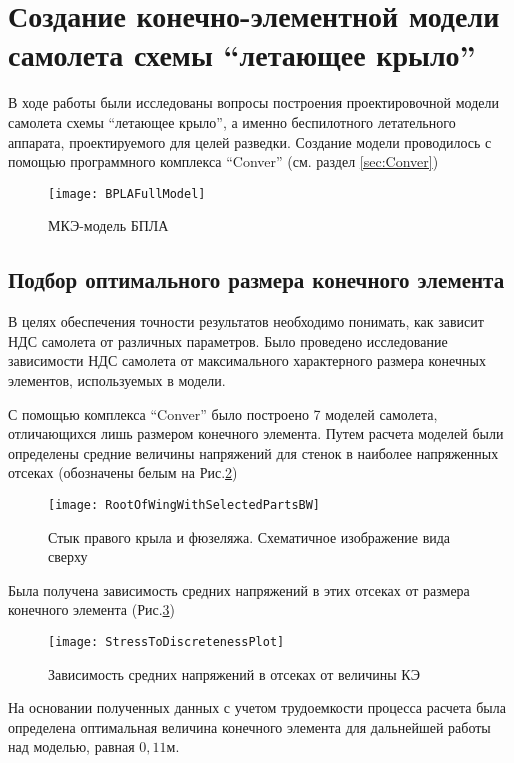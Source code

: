 \section{Создание конечно-элементной модели самолета схемы ``летающее крыло''}

В ходе работы были исследованы вопросы построения проектировочной модели самолета схемы ``летающее крыло'', а именно беспилотного летательного аппарата, проектируемого для целей разведки. Создание модели проводилось с помощью программного комплекса ``Conver'' (см. раздел \ref{sec:Conver})

\begin{figure}[ht]
\centering
\texttt{[image: BPLAFullModel]}
\caption{МКЭ-модель БПЛА}
\label{fig:BPLAFullModel}
\end{figure}

\subsection{Подбор оптимального размера конечного элемента}

В целях обеспечения точности результатов необходимо понимать, как зависит НДС самолета от различных параметров. Было проведено исследование зависимости НДС самолета от максимального характерного размера конечных элементов, используемых в модели. 

С помощью комплекса ``Conver'' было построено 7 моделей самолета, отличающихся лишь размером конечного элемента. Путем расчета моделей были определены средние величины напряжений для стенок в наиболее напряженных отсеках (обозначены белым на  Рис.\ref{fig:WingRootPlain})

\begin{figure}[ht]
\centering
\texttt{[image: RootOfWingWithSelectedPartsBW]}
\caption{Стык правого крыла и фюзеляжа. Схематичное изображение вида сверху}
\label{fig:WingRootPlain}
\end{figure}




Была получена зависимость средних напряжений в этих отсеках от размера конечного элемента (Рис.\ref{fig:stressToDiscreteness})
\begin{figure}[ht]
\centering
\texttt{[image: StressToDiscretenessPlot]}
\caption{Зависимость средних напряжений в отсеках от величины КЭ}
\label{fig:stressToDiscreteness}
\end{figure}

На основании полученных данных с учетом трудоемкости процесса расчета была определена оптимальная величина конечного элемента для дальнейшей работы над моделью, равная $0,11\text{м}$. 
